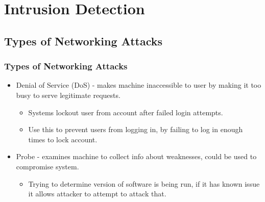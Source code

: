 \documentclass{beamer}
\newcommand{\linespace}{\vskip 0.25cm}
\begin{document}
\section[Intrusion Detection]{Intrusion Detection}
\subsection{Types of Networking Attacks}
\begin{frame}
  \frametitle{Types of Networking Attacks}
  \begin{itemize}
  	\item Denial of Service (DoS) - makes machine inaccessible to user by making it too busy to serve legitimate requests.
  	
  	\begin{itemize}
  		\item Systems lockout user from account after failed login attempts. 
  		\item Use this to prevent users from logging in, by failing to log in enough times to lock account.
  	\end{itemize}

  	\linespace
  	\linespace
  	\linespace
  	
  	\item Probe - examines machine to collect info about weaknesses, could be used to compromise system.
  	
  	\begin{itemize}
  		\item Trying to determine version of software is being run, if it has known issue it allows attacker to attempt to attack that.
  	\end{itemize}
  \end{itemize}
\end{frame}
\end{document}
